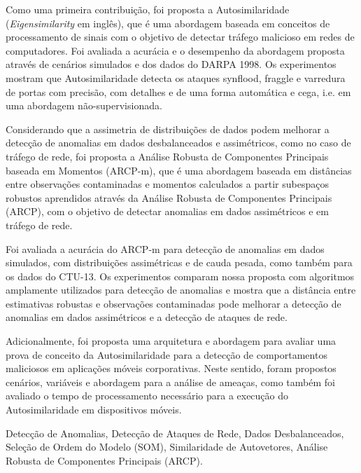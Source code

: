 Como uma primeira contribuição, foi proposta a Autosimilaridade (\textit{Eigensimilarity} em inglês), que é uma abordagem baseada em conceitos de processamento de sinais com o objetivo de detectar tráfego malicioso em redes de computadores. Foi avaliada a acurácia e o desempenho da abordagem proposta através de cenários simulados e dos dados do DARPA 1998. Os experimentos mostram que Autosimilaridade detecta os ataques synflood, fraggle e varredura de portas com precisão, com detalhes e de uma forma automática e cega, i.e. em uma abordagem não-supervisionada. 

Considerando que a assimetria de distribuições de dados podem melhorar a detecção de anomalias em dados desbalanceados e assimétricos, como no caso de tráfego de rede, foi proposta a Análise Robusta de Componentes Principais baseada em Momentos (ARCP-m), que é uma abordagem baseada em distâncias entre observações contaminadas e momentos calculados a partir subespaços robustos aprendidos através da Análise Robusta de Componentes Principais (ARCP), com o objetivo de detectar anomalias em dados assimétricos e em tráfego de rede.  

Foi avaliada a acurácia do ARCP-m para detecção de anomalias em dados simulados, com distribuições assimétricas e de cauda pesada, como também para os dados do CTU-13. Os experimentos comparam nossa proposta com algoritmos amplamente utilizados para detecção de anomalias e mostra que a distância entre estimativas robustas e observações contaminadas pode melhorar a detecção de anomalias em dados assimétricos e a detecção de ataques de rede.

Adicionalmente, foi proposta uma arquitetura e abordagem para avaliar uma prova de conceito da Autosimilaridade para a detecção de comportamentos maliciosos em aplicações móveis corporativas. Neste sentido, foram propostos cenários, variáveis e abordagem para a análise de ameaças, como também foi avaliado o tempo de processamento necessário para a execução do Autosimilaridade em dispositivos móveis.

\begin{keywords}
Detecção de Anomalias, Detecção de Ataques de Rede, Dados Desbalanceados, Seleção de Ordem do Modelo (SOM), Similaridade de Autovetores, Análise Robusta de Componentes Principais (ARCP). 
\end{keywords}
